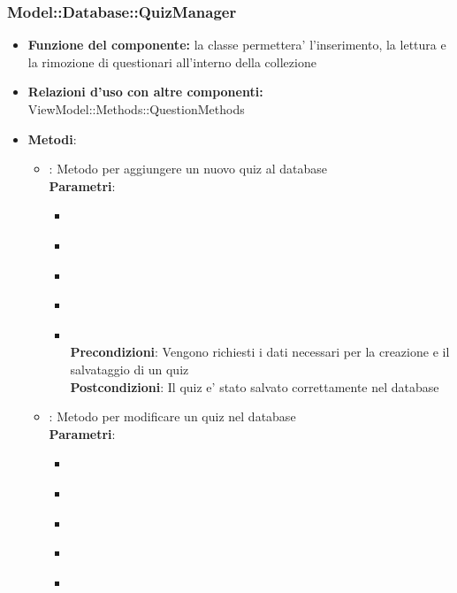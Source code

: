 \subsubsection{Model::Database::QuizManager}
\begin{itemize}
\item\textbf{Funzione del componente:} la classe permettera' l'inserimento, la lettura e la rimozione di questionari all'interno della collezione
\item\textbf{Relazioni d'uso con altre componenti:} ViewModel::Methods::QuestionMethods\\
\item\textbf{Metodi}:
\begin{itemize}
	\item{} : Metodo per aggiungere un nuovo quiz al database\\
	\textbf{Parametri}:
	\begin{itemize}
		\item{}\\
		\item{}\\
		\item{}\\
		\item{}\\
		\item{}\\
		\textbf{Precondizioni}: Vengono richiesti i dati necessari per la creazione e il salvataggio di un quiz\\
		\textbf{Postcondizioni}: Il quiz e' stato salvato correttamente nel database\\
	\end{itemize}
	\item{} :  Metodo per modificare un quiz nel database\\
	\textbf{Parametri}:
	\begin{itemize}
		\item{}\\
		\item{}\\
		\item{}\\
		\item{}\\
		\item{}\\

\end{itemize}
\end{itemize}
\end{itemize}
